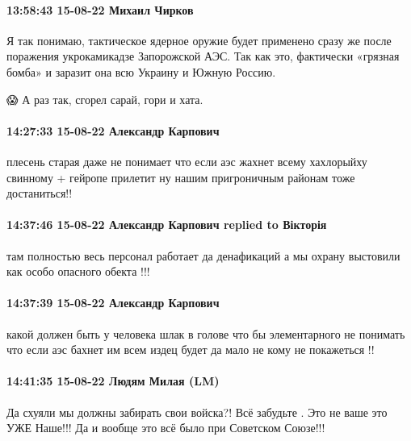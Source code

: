  
 
 
 
 

\paragraph{13:58:43 15-08-22 Михаил Чирков}

Я так понимаю, тактическое ядерное оружие будет применено сразу же после
поражения укрокамикадзе Запорожской АЭС. Так как это, фактически «грязная
бомба» и заразит она всю Украину и Южную Россию.

😱
А раз так, сгорел сарай, гори и хата.

\paragraph{14:27:33 15-08-22 Александр Карпович}

плесень старая даже не понимает что если аэс жахнет всему хахлорыйху свинному +
гейропе прилетит ну нашим пригроничным районам тоже достаниться!!

\paragraph{14:37:46 15-08-22 Александр Карпович replied to Вікторія}

там полностью весь персонал работает да денафикаций а мы охрану выстовили как
особо опасного обекта !!!

\paragraph{14:37:39 15-08-22 Александр Карпович}

какой должен быть у человека шлак в голове что бы элементарного не понимать что
если аэс бахнет им всем издец будет да мало не кому не покажеться !!


\paragraph{14:41:35 15-08-22 Людям Милая  (LM)}

Да схуяли мы должны забирать свои войска?! Всё забудьте . Это не ваше это УЖЕ Наше!!!
Да и вообще это всё было при Советском Союзе!!!


